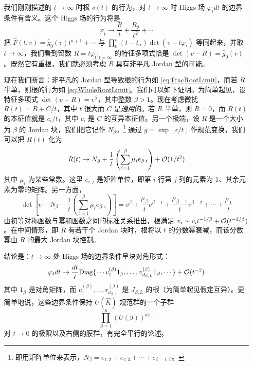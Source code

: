 我们刚刚描述的 $t\to \infty$ 时根 $v(t)$ 的行为，对 $t\to\infty$ 时 Higgs 场 $\varphi_t dt$ 的边界条件有含义。这个 Higgs 场的行为将是
\begin{equation}\label{eq:ch05-phiAsym}
\varphi_t \to \frac{R}{t} + \frac{R_2}{t^2} + \cdots
\end{equation}
把 $\hat F(t,v) = \hat g_0(v) t^{n+1} + \cdots $ 与 $\prod_0^n (t-t_\alpha) \det(v-t\varphi_t)$ 等同起来，并取 $t\to \infty$，我们看到留数 $R = t \varphi_t\vert_{t=\infty}$ 的特征多项式恰是 $\det(v-R) = \hat g_0(v)$。既然它有重根，我们就必须考虑 $R$ 具有非平凡 Jordan 型的可能。

现在我们断言：非平凡的 Jordan 型导致根的行为如 \eqref{eq:FracRootLimit}，而若 $R$ 半单，则根的行为如 \eqref{eq:WholeRootLimit}。我们可以如下证明。为简单起见，设特征多项式 $\det(v-R) = v^\beta$，其中整数 $\beta > 1$。现在考虑微扰 $R(t) = R + C/t $，其中 $t$ 很大而 $C$ 是\emph{通用}的。若 $R$ 半单，则 $R=0$，而 $R(t)$ 的本征值就是 $c_i/t$，其中 $c_i$ 是 $C$ 的互异本征值。另一个极端，设 $R$ 是一个大小为 $\beta$ 的 Jordan 块，我们把它记作 $N_\beta$。\footnote{即用矩阵单位来表示，$N_\beta = e_{1,2} + e_{2,3} + \cdots + e_{\beta-1,\beta}$。} 通过 $g= \exp[\epsilon/t]$ 作规范变换，我们可以把 $R(t)$ 化为
\begin{equation}\label{eq:ch05-Jordanpert}
R(t) \to N_\beta + \frac{1}{t}\left( \sum_{i=1}^\beta \mu_i
e_{\beta,i} \right) + \mathcal{O}(1/t^2)
\end{equation}
其中 $\mu_i$ 为某些常数。这里 $e_{i,j}$ 是矩阵单位，即第 $i$ 行第 $j$ 列的元素为 $1$、其余元素为零的矩阵。另一方面，
\begin{equation}\label{eq:UsefulDet}
\det\left[ v - N_\beta -\frac{1}{t}\left( \sum_{i=1}^\beta \mu_i
e_{\beta,i} \right)\right]= v^{\beta} +
\frac{\mu_{\beta}}{t}v^{\beta-1} + \frac{\mu_{\beta-1}}{t}
v^{\beta-2} + \cdots + \frac{\mu_1}{t}
\end{equation}
由初等对称函数与幂和函数之间的标准关系推出，根满足 $v_i
\sim c_i t^{-1/\beta} + \mathcal{O}(t^{-2/\beta}) $。在中间情形，即 $R$ 有若干个 Jordan 块时，根将以 $t$ 的分数幂衰减，而该分数幂由 $R$ 的最大 Jordan 块控制。

结论是：$t\to \infty$ 处 Higgs 场的边界条件呈块对角形式：
\begin{equation}\label{eq:RegSingBalanced}
\varphi_t dt \to  \frac{dt}{t} {\rm Diag}\{ \cdots  v^{(\beta)}_1
1_{\beta},\dots,v^{(\beta)}_{d_{\beta,L}} 1_{\beta}, \cdots \} +
\mathcal{O}(t^{-2})
\end{equation}
其中 $1_{\beta}$ 是对角矩阵，而 $v^{(\beta)}_1
,\dots,v^{(\beta)}_{d_{\beta,L}}$ 是 $J_{\beta,L}$ 的根（为简单起见假定互异）。更简单地说，这些边界条件保持 $U(\hat K)$ 规范群的一个子群
\begin{equation}\label{eq:ch05-subgroup}
\prod_{\beta=1}^n (U(\beta))^{d_{\beta,L}}
\end{equation}
对 $t\to 0$ 的极限以及右侧的膜群，有完全平行的论述。

